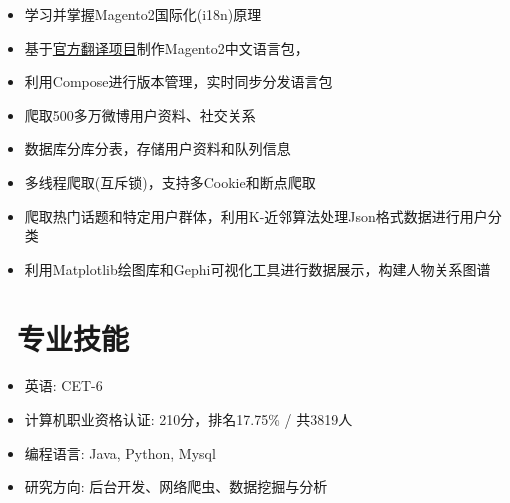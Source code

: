 \documentclass{resume}
\begin{document}
    \begin{onehalfspacing}
        \begin{itemize}
            \item 学习并掌握Magento2国际化(i18n)原理
            \item 基于\href{https://crowdin.com/project/magento-2/zh-CN}{官方翻译项目}制作Magento2中文语言包，
            \item 利用Compose进行版本管理，实时同步分发语言包
        \end{itemize}
    \end{onehalfspacing}
    \blankline{ }

    \begin{onehalfspacing}
        \begin{itemize}
            \item 爬取500多万微博用户资料、社交关系
            \item 数据库分库分表，存储用户资料和队列信息
            \item 多线程爬取(互斥锁)，支持多Cookie和断点爬取
            \item 爬取热门话题和特定用户群体，利用K-近邻算法处理Json格式数据进行用户分类
            \item 利用Matplotlib绘图库和Gephi可视化工具进行数据展示，构建人物关系图谱
        \end{itemize}
    \end{onehalfspacing}
    \blankline{ }

    \section{\faCogs\ 专业技能}
    \begin{itemize}[parsep=0.5ex]
        \item 英语: CET-6
        \item 计算机职业资格认证: 210分，排名17.75\% / 共3819人
        \item 编程语言: Java, Python, Mysql
        \item 研究方向: 后台开发、网络爬虫、数据挖掘与分析
    \end{itemize}
    \blankline{ }
\end{document}
